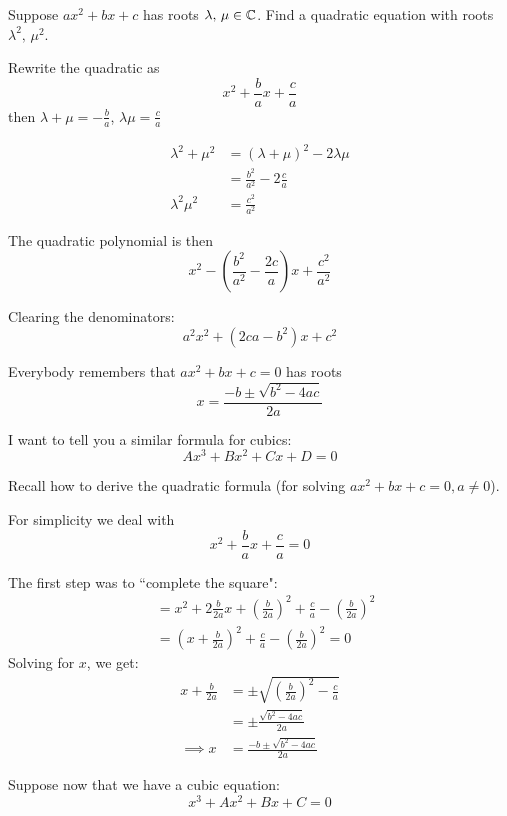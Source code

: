 \documentclass[10pt]{scrartcl}
\begin{document}
\begin{example}
Suppose $ax^2 + bx + c$ has roots $\lambda,\, \mu \in\mathbb{C}$. Find a quadratic equation with roots $\lambda^2,\, \mu^2$. 

Rewrite the quadratic as
\[x^2 + \frac{b}{a}x + \frac{c}{a}\]
then $\lambda + \mu = -\frac{b}{a}$, $\lambda\mu = \frac{c}{a}$

\[
\begin{aligned}
  \lambda^2 + \mu^2 &= (\lambda + \mu)^2 - 2\lambda\mu\\
  &= \frac{b^2}{a^2} - 2\frac{c}{a}\\[0.3cm] 
\lambda^2\mu^2 &= \frac{c^2}{a^2}
\end{aligned}
\]

The quadratic polynomial is then 
\[x^2 - \textstyle{(\frac{b^2}{a^2} - \frac{2c}{a})x + \frac{c^2}{a^2}}\]

Clearing the denominators: 
\[a^2x^2 + (2ca - b^2)x + c^2\]

\end{example}
\vspace*{5pt}

Everybody remembers that $ax^2 + bx + c = 0$ has roots  
\[x = \frac{-b\pm \sqrt{b^2 - 4ac}}{2a}\]

I want to tell you a similar formula for cubics: 
\[Ax^3 + Bx^2 + Cx + D = 0\]

Recall how to derive the quadratic formula (for solving $ax^2 + bx + c = 0, a \neq 0$).

For simplicity we deal with
\[x^2 + \frac{b}{a}x + \frac{c}{a} = 0\]

The first step was to ``complete the square": 
\[
\begin{aligned}
  &= x^2 + 2\frac{b}{2a}x + \left(\frac{b}{2a}\right)^2 + \frac{c}{a} - \left(\frac{b}{2a}\right)^2\\
  &= \left(x + \frac{b}{2a}\right)^2 + \frac{c}{a} - \left(\frac{b}{2a}\right)^2 = 0
\end{aligned}
\]
Solving for $x$, we get:
\[
\begin{aligned}
  x + \frac{b}{2a} &= \textstyle{\pm\sqrt{\left(\frac{b}{2a}\right)^2 - \frac{c}{a}}}\\[0.2cm]
  &= \pm \frac{\sqrt{b^2 - 4ac}}{2a}\\[0.2cm]
  \implies x &= \frac{-b \pm\sqrt{b^2 - 4ac}}{2a}
\end{aligned}
\]

Suppose now that we have a cubic equation:
\[x^3 + Ax^2 + Bx + C = 0\]
\end{document}
